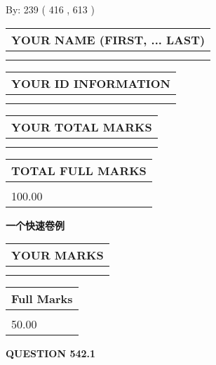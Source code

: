 \documentclass{ctexart}
\begin{document}
   
\hspace{1.0in} By: 
 239 ( 416 ,  613 )
   
   
   
   
\newpage 
\setcounter{page}{ 
   542001 } 
   
   
   
   
\noindent\begin{tabular}{|l|}
\hline
YOUR NAME (FIRST, ... LAST)  \\
\hline
 \\ 
 \\ 
\hline
\end{tabular}
\hspace{0.05in} \begin{tabular}{|l|}
\hline
 YOUR   ID   INFORMATION  \\
\hline
 \\ 
 \\ 
\hline
\end{tabular}
   
   
\vspace{0.2in}\noindent\begin{tabular}{|l|}
\hline
YOUR TOTAL MARKS  \\
\hline
 \\ 
 \\ 
\hline
\end{tabular}
\hspace{0.05in} \begin{tabular}{|l|}
\hline
TOTAL FULL MARKS  \\
\hline
 \\ 
100.00 \\
\hline
\end{tabular}
   
   
 \vspace{0.2in}
{\LARGE {\textbf{ 一个快速卷例}}}
   
   
  
\vspace{0.2in}
  
\noindent\begin{tabular}{|l|}
\hline
 YOUR MARKS  \\
\hline
 \\ 
 \\ 
\hline
\end{tabular}
\hspace{0.05in} \begin{tabular}{|l|}
\hline
 Full Marks  \\
\hline
 \\ 
50.00 \\
\hline
\end{tabular}
{\textbf{\Large{QUESTION
542.1 
}}}
  
\end{document}
